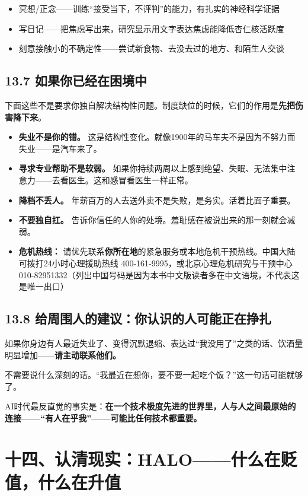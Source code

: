 \documentclass[11pt,a4paper]{ctexart}
\begin{document}
\begin{itemize}
  \item 冥想/正念——训练“接受当下，不评判”的能力，有扎实的神经科学证据
  \item 写日记——把焦虑写出来，研究显示用文字表达焦虑能降低杏仁核活跃度
  \item 刻意接触小的不确定性——尝试新食物、去没去过的地方、和陌生人交谈
\end{itemize}

\subsection{13.7 如果你已经在困境中}

下面这些不是要求你独自解决结构性问题。制度缺位的时候，它们的作用是\textbf{先把伤害降下来}。

\begin{itemize}
  \item \textbf{失业不是你的错。} 这是结构性变化。就像1900年的马车夫不是因为不努力而失业——是汽车来了。
  \item \textbf{寻求专业帮助不是软弱。} 如果你持续两周以上感到绝望、失眠、无法集中注意力——去看医生。这和感冒看医生一样正常。
  \item \textbf{降档不丢人。} 年薪百万的人去送外卖不是失败，是务实。活着比面子重要。
  \item \textbf{不要独自扛。} 告诉你信任的人你的处境。羞耻感在被说出来的那一刻就会减弱。
  \item \textbf{危机热线：} 请优先联系\textbf{你所在地}的紧急服务或本地危机干预热线。中国大陆可拨打24小时心理援助热线 400-161-9995，或北京心理危机研究与干预中心 010-82951332（列出中国号码是因为本书中文版读者多在中文语境，不代表这是唯一出口）
\end{itemize}

\subsection{13.8 给周围人的建议：你认识的人可能正在挣扎}

如果你身边有人最近失业了、变得沉默退缩、表达过“我没用了”之类的话、饮酒量明显增加——\textbf{请主动联系他们。}

不需要说什么深刻的话。“我最近在想你，要不要一起吃个饭？”这一句话可能就够了。

AI时代最反直觉的事实是：\textbf{在一个技术极度先进的世界里，人与人之间最原始的连接——“有人在乎我”——可能比任何技术都重要。}

\section{十四、认清现实：HALO——什么在贬值，什么在升值}
\end{document}
